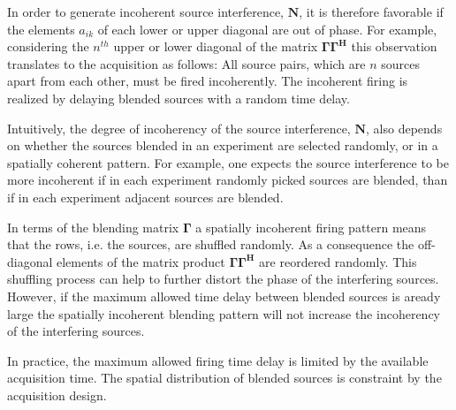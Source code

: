 In order to generate incoherent source interference, $\mathbf{N}$, it is therefore favorable if the elements $a_{ik}$ of each lower or upper diagonal are out of phase. For example, considering the $n^{th}$ upper or lower diagonal of the matrix $\mathbf{\Gamma \Gamma^H}$ this observation translates to the acquisition as follows: All source pairs, which are $n$ sources apart from each other, must be fired incoherently. The incoherent firing is realized by delaying blended sources with a random time delay.

Intuitively, the degree of incoherency of the source interference, $\mathbf{N}$, also depends on whether the sources blended in an experiment are selected randomly, or in a spatially coherent pattern. For example, one expects the source interference to be more incoherent if in each experiment randomly picked sources are blended, than if in each experiment adjacent sources are blended.

In terms of the blending matrix $\mathbf{\Gamma}$ a spatially incoherent firing pattern means that the rows, i.e. the sources, are shuffled randomly. As a consequence the off-diagonal elements of the matrix product $\mathbf{\Gamma \Gamma^H}$ are reordered randomly. This shuffling process can help to further distort the phase of the interfering sources. However, if the maximum allowed time delay between blended sources is aready large the spatially incoherent blending pattern will not increase the incoherency of the interfering sources.   

In practice, the maximum allowed firing time delay is limited by the available acquisition time. The spatial distribution of blended sources is constraint by the acquisition design.


